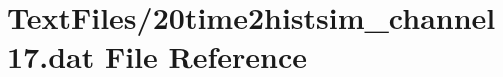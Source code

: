 \hypertarget{20time2histsim__channel17_8dat}{}\section{Text\+Files/20time2histsim\+\_\+channel17.dat File Reference}
\label{20time2histsim__channel17_8dat}
